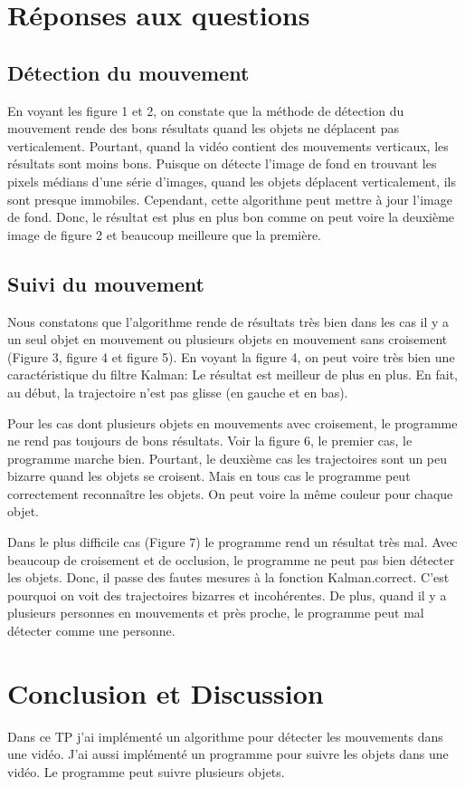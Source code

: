 \documentclass[french,12pt,a4paper,oneside,notitlepage]{report}
\begin{document}
\clearpage
\section{Réponses aux questions}
\subsection{Détection du mouvement}
En voyant les figure 1 et 2, on constate que la méthode de détection du mouvement rende 
des bons résultats quand les objets ne déplacent pas verticalement. Pourtant, quand la 
vidéo contient des mouvements verticaux, les résultats sont moins bons. Puisque on 
détecte l'image de fond en trouvant les pixels médians d'une série d'images, quand les 
objets déplacent verticalement, ils sont presque immobiles. Cependant, cette algorithme 
peut mettre à jour l'image de fond. Donc, le résultat est plus en plus bon comme on peut 
voire la deuxième image de figure 2 et beaucoup meilleure que la première. 
\subsection{Suivi du mouvement}
Nous constatons que l'algorithme rende de résultats très bien dans les cas il y a un seul 
objet en mouvement ou plusieurs objets en mouvement sans croisement (Figure 3, figure 
4 et figure 5). En voyant la figure 4, on peut voire très bien une caractéristique du 
filtre Kalman: Le résultat est meilleur de plus en plus. En fait, au début, la 
trajectoire n'est pas glisse (en gauche et en bas).

Pour les cas dont plusieurs objets en mouvements avec croisement, le programme ne rend 
pas toujours de bons résultats. Voir la figure 6, le premier cas, le programme marche 
bien. Pourtant, le deuxième cas les trajectoires sont un peu bizarre quand les objets 
se croisent. Mais en tous cas le programme peut correctement reconnaître les objets. On 
peut voire la même couleur pour chaque objet.

Dans le plus difficile cas (Figure 7) le programme rend un résultat très mal. Avec 
beaucoup de croisement et de occlusion, le programme ne peut pas bien détecter les 
objets. Donc, il passe des fautes mesures à la fonction Kalman.correct. C'est pourquoi on 
voit des trajectoires bizarres et incohérentes. De plus, quand il y a plusieurs personnes 
en mouvements et près proche, le programme peut mal détecter comme une personne. 
\section{Conclusion et Discussion}
Dans ce TP j'ai implémenté un algorithme pour détecter les mouvements dans une vidéo. 
J'ai aussi implémenté un programme pour suivre les objets dans une vidéo. Le programme 
peut suivre plusieurs objets.
\end{document}
